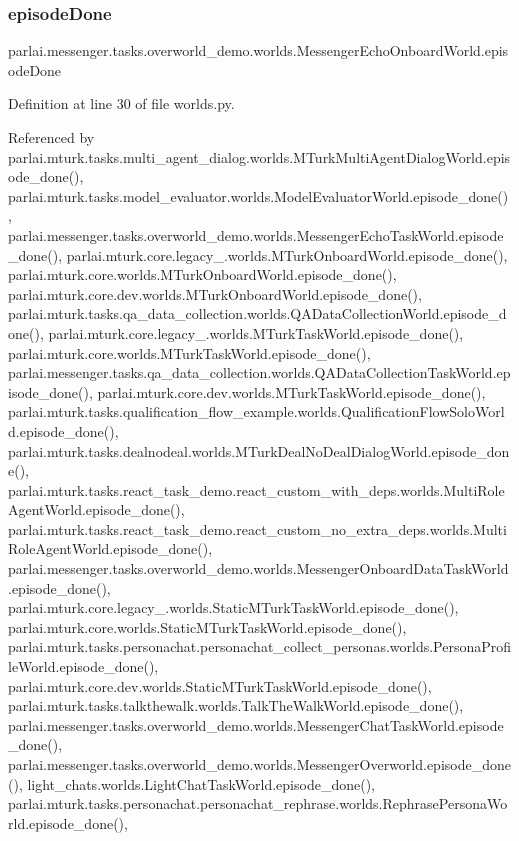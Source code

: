 \subsubsection{\texorpdfstring{episode\+Done}{episodeDone}}
{\footnotesize\ttfamily parlai.\+messenger.\+tasks.\+overworld\+\_\+demo.\+worlds.\+Messenger\+Echo\+Onboard\+World.\+episode\+Done}



Definition at line 30 of file worlds.\+py.



Referenced by parlai.\+mturk.\+tasks.\+multi\+\_\+agent\+\_\+dialog.\+worlds.\+M\+Turk\+Multi\+Agent\+Dialog\+World.\+episode\+\_\+done(), parlai.\+mturk.\+tasks.\+model\+\_\+evaluator.\+worlds.\+Model\+Evaluator\+World.\+episode\+\_\+done(), parlai.\+messenger.\+tasks.\+overworld\+\_\+demo.\+worlds.\+Messenger\+Echo\+Task\+World.\+episode\+\_\+done(), parlai.\+mturk.\+core.\+legacy\+\_.\+worlds.\+M\+Turk\+Onboard\+World.\+episode\+\_\+done(), parlai.\+mturk.\+core.\+worlds.\+M\+Turk\+Onboard\+World.\+episode\+\_\+done(), parlai.\+mturk.\+core.\+dev.\+worlds.\+M\+Turk\+Onboard\+World.\+episode\+\_\+done(), parlai.\+mturk.\+tasks.\+qa\+\_\+data\+\_\+collection.\+worlds.\+Q\+A\+Data\+Collection\+World.\+episode\+\_\+done(), parlai.\+mturk.\+core.\+legacy\+\_.\+worlds.\+M\+Turk\+Task\+World.\+episode\+\_\+done(), parlai.\+mturk.\+core.\+worlds.\+M\+Turk\+Task\+World.\+episode\+\_\+done(), parlai.\+messenger.\+tasks.\+qa\+\_\+data\+\_\+collection.\+worlds.\+Q\+A\+Data\+Collection\+Task\+World.\+episode\+\_\+done(), parlai.\+mturk.\+core.\+dev.\+worlds.\+M\+Turk\+Task\+World.\+episode\+\_\+done(), parlai.\+mturk.\+tasks.\+qualification\+\_\+flow\+\_\+example.\+worlds.\+Qualification\+Flow\+Solo\+World.\+episode\+\_\+done(), parlai.\+mturk.\+tasks.\+dealnodeal.\+worlds.\+M\+Turk\+Deal\+No\+Deal\+Dialog\+World.\+episode\+\_\+done(), parlai.\+mturk.\+tasks.\+react\+\_\+task\+\_\+demo.\+react\+\_\+custom\+\_\+with\+\_\+deps.\+worlds.\+Multi\+Role\+Agent\+World.\+episode\+\_\+done(), parlai.\+mturk.\+tasks.\+react\+\_\+task\+\_\+demo.\+react\+\_\+custom\+\_\+no\+\_\+extra\+\_\+deps.\+worlds.\+Multi\+Role\+Agent\+World.\+episode\+\_\+done(), parlai.\+messenger.\+tasks.\+overworld\+\_\+demo.\+worlds.\+Messenger\+Onboard\+Data\+Task\+World.\+episode\+\_\+done(), parlai.\+mturk.\+core.\+legacy\+\_.\+worlds.\+Static\+M\+Turk\+Task\+World.\+episode\+\_\+done(), parlai.\+mturk.\+core.\+worlds.\+Static\+M\+Turk\+Task\+World.\+episode\+\_\+done(), parlai.\+mturk.\+tasks.\+personachat.\+personachat\+\_\+collect\+\_\+personas.\+worlds.\+Persona\+Profile\+World.\+episode\+\_\+done(), parlai.\+mturk.\+core.\+dev.\+worlds.\+Static\+M\+Turk\+Task\+World.\+episode\+\_\+done(), parlai.\+mturk.\+tasks.\+talkthewalk.\+worlds.\+Talk\+The\+Walk\+World.\+episode\+\_\+done(), parlai.\+messenger.\+tasks.\+overworld\+\_\+demo.\+worlds.\+Messenger\+Chat\+Task\+World.\+episode\+\_\+done(), parlai.\+messenger.\+tasks.\+overworld\+\_\+demo.\+worlds.\+Messenger\+Overworld.\+episode\+\_\+done(), light\+\_\+chats.\+worlds.\+Light\+Chat\+Task\+World.\+episode\+\_\+done(), parlai.\+mturk.\+tasks.\+personachat.\+personachat\+\_\+rephrase.\+worlds.\+Rephrase\+Persona\+World.\+episode\+\_\+done(), 